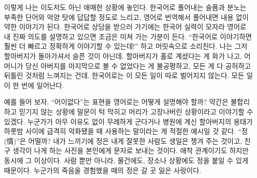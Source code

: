 \documentclass{translation}
\begin{document}
이렇게 나는 이도저도 아닌 애매한 상황에 놓인다.
한국어로 풀어내는 슬픔과 분노는 부족한 단어와 억양 탓에 답답할 정도로 느리고, 영어로 번역해서 풀어내면 내용 없이 약한 이야기가 된다.
한국어로 상담을 받으러 가기에는 한국어 실력이 모자라 영어로 내 진짜 의도를 설명하고 있으면 조금은 미쳐 가는 가분이 든다.
``한국어로 이야기하면 훨씬 더 빠르고 정확하게 이야기할 수 있는데!'' 하고 머릿속으로 소리친다.
나는 그저 할아버지가 돌아가셔서 슬픈 것이 아닌데.
할아버지가 홀로 계셨다는 게 화가 나고, 어머니가 당신 아버지를 마지막으로 볼 수 없었다는 게 불공평하고, 모든 게 다 공허하고 뒤틀린 것처럼 느껴지는 건데.
한국어로는 이 모든 일이 따로 벌어지지 않는다.
모든 일이 한 번에 일어난다.
%  

예를 들어 보자.
``어이없다''는 표현을 영어로는 어떻게 설명해야 할까?
약간은 불합리하고 믿기지 않는 상황에 말문이 턱 막히고 머리가 고장나버린 상황이라고 이야기할 수 있겠다.
누군가가 아무 이유도 없이 무례하게 군다거나 병원에 계신 할아버지의 용태가 하룻밤 사이에 급격히 악화됐을 때 사용하는 말이라는 게 적절한 예시일 것 같다.
``정(情)''은 어떨까?
내가 느끼기에 정은 내게 잘못한 사람도 생일은 챙겨 주는 것이고, 친구 생각이 나게 하는 사진을 본인에게 문자로 보내는 것이다.
애착 관계이기도 하지만 동시에 그 이상이다.
사람 뿐만 아니라, 물건에도, 장소나 상황에도 정을 붙일 수 있게 때문이다.
누군가의 죽음을 경험했을 때의 정은 갈 곳 잃은 사랑이다.
%  
\end{document}
